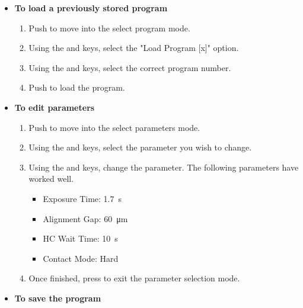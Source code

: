 \begin{enumerate}
\begin{itemize} [noitemsep, nolistsep]
  \begin{enumerate} 
    \item Push .
    \item Use the \boxed{\uparrow} and \boxed{\downarrow} keys to select a contact mode. We generally use \textbf{Hard} contact mode.
    \item Push  and move on to the edit parameters step.
  \end{enumerate}
  \item \textbf{To load a previously stored program}
  \begin{enumerate} 
    \item Push  to move into the select program mode.
    \item Using the \boxed{\leftarrow} and \boxed{\rightarrow} keys, select the "Load Program [x]" option.
    \item Using the \boxed{\uparrow} and \boxed{\downarrow} keys, select the correct program number.
    \item Push  to load the program.
  \end{enumerate}
  \item \textbf{To edit parameters}
  \begin{enumerate} 
    \item Push  to move into the select parameters mode.
    \item Using the \boxed{\leftarrow} and \boxed{\rightarrow} keys, select the parameter you wish to change.
    \item Using the \boxed{\uparrow} and \boxed{\downarrow} keys, change the parameter. The following parameters
          have worked well.
    \begin{itemize} [noitemsep, nolistsep]
      \item Exposure Time: \SI{1.7}{\second}
      \item Alignment Gap: \SI{60}{\micro\meter}
      \item HC Wait Time: \SI{10}{\second}
      \item Contact Mode: Hard
    \end{itemize}
    \item Once finished, press  to exit the parameter selection mode.
  \end{enumerate}
  \item \textbf{To save the program}
  \begin{enumerate} 

\end{enumerate}
\end{itemize}
\end{enumerate}
